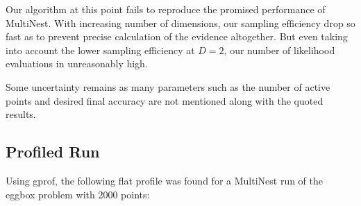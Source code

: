 \documentclass{article}
\begin{document}
Our algorithm at this point fails to reproduce the promised performance of MultiNest. With increasing number of dimensions, our sampling efficiency drop so fast as to prevent precise calculation of the evidence altogether. But even taking into account the lower sampling efficiency at $D=2$, our number of likelihood evaluations in unreasonably high.

Some uncertainty remains as many parameters such as the number of active points and desired final accuracy are not mentioned along with the quoted results.

\subsection{Profiled Run}
Using gprof, the following flat profile was found for a MultiNest run of the eggbox problem with 2000 points:
\end{document}
